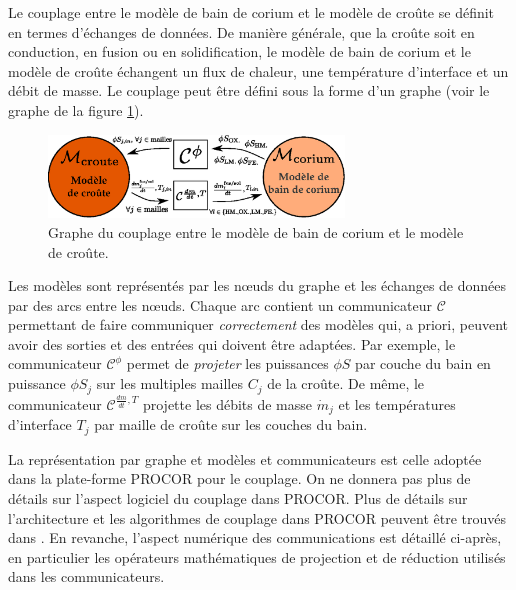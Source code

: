 Le couplage entre le modèle de bain de corium et le modèle de croûte se définit en termes d'échanges de données. De manière générale, que la croûte soit en conduction, en fusion ou en solidification, le modèle de bain de corium et le modèle de croûte échangent un flux de chaleur, une température d'interface et un débit de masse. Le couplage peut être défini sous la forme d'un graphe (voir le graphe de la figure \ref{fig:graphe_couplage_corium_croute}). 
\begin{figure}
\centering
\includegraphics[width=0.7\textwidth, keepaspectratio=true]{Figures/graphe_couplage_corium_croute.eps}
\caption{Graphe du couplage entre le modèle de bain de corium et le modèle de croûte.}
\label{fig:graphe_couplage_corium_croute}
\end{figure}
Les modèles sont représentés par les n\oe{}uds du graphe et les échanges de données par des arcs entre les n\oe{}uds. Chaque arc contient un communicateur $\mathcal{C}$ permettant de faire communiquer \emph{correctement} des modèles qui, a priori, peuvent avoir des sorties et des entrées qui doivent être adaptées. Par exemple, le communicateur $\mathcal{C}^{\phi}$ permet de \emph{projeter} les puissances $\phi S$ par couche du bain en puissance $\phi S_j$ sur les multiples mailles $C_j$ de la croûte. De même, le communicateur $\mathcal{C}^{\frac{dm}{dt}, T}$ projette les débits de masse $\dot{m}_j$ et les températures d'interface $T_j$ par maille de croûte sur les couches du bain. 

La représentation par graphe et modèles et communicateurs est celle adoptée dans la plate-forme PROCOR pour le couplage. On ne donnera pas plus de détails sur l'aspect logiciel du couplage dans PROCOR. Plus de détails sur l'architecture et les algorithmes de couplage dans PROCOR peuvent être trouvés dans \cite{Viot2018}. En revanche, l'aspect numérique des communications est détaillé ci-après, en particulier les opérateurs mathématiques de projection et de réduction utilisés dans les communicateurs.
